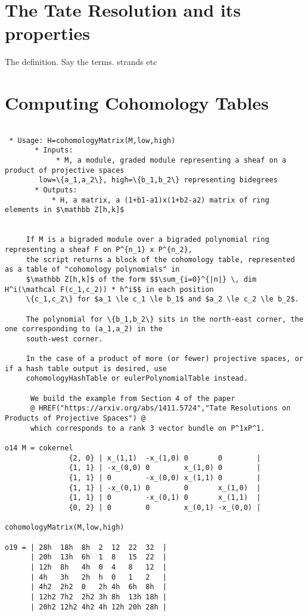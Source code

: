 \documentclass[twoside,12pt, leqno]{amsart}
\begin{document}
\section{The Tate Resolution and its properties}\label{TateRes}

The definition.  Say the terms.
strands etc

\section{Computing Cohomology Tables}

\begin{verbatim}
 
 * Usage: H=cohomologyMatrix(M,low,high)
       * Inputs:
            * M, a module, graded module representing a sheaf on a product of projective spaces
        low=\{a_1,a_2\}, high=\{b_1,b_2\} representing bidegrees
       * Outputs:
           * H, a matrix, a (1+b1-a1)x(1+b2-a2) matrix of ring elements in $\mathbb Z[h,k]$

 
     If M is a bigraded module over a bigraded polynomial ring representing a sheaf F on P^{n_1} x P^{n_2},
     the script returns a block of the cohomology table, represented as a table of "cohomology polynomials" in
     $\mathbb Z[h,k]$ of the form $$\sum_{i=0}^{|n|} \, dim H^i(\mathcal F(c_1,c_2)) * h^i$$ in each position
     \{c_1,c_2\} for $a_1 \le c_1 \le b_1$ and $a_2 \le c_2 \le b_2$. 
     
     The polynomial for \{b_1,b_2\} sits in the north-east corner, the one corresponding to (a_1,a_2) in the
     south-west corner.

     In the case of a product of more (or fewer) projective spaces, or if a hash table output is desired, use
     cohomologyHashTable or eulerPolynomialTable instead.

      We build the example from Section 4 of the paper
      @ HREF("https://arxiv.org/abs/1411.5724","Tate Resolutions on Products of Projective Spaces") @
      which corresponds to a rank 3 vector bundle on P^1xP^1. 

o14 M = cokernel 
               {2, 0} | x_(1,1)  -x_(1,0) 0       0        |
               {1, 1} | -x_(0,0) 0        x_(1,0) 0        |
               {1, 1} | 0        -x_(0,0) x_(1,1) 0        |
               {1, 1} | -x_(0,1) 0        0       x_(1,0)  |
               {1, 1} | 0        -x_(0,1) 0       x_(1,1)  |
               {0, 2} | 0        0        x_(0,1) -x_(0,0) |
   
cohomologyMatrix(M,low,high)

o19 = | 28h  18h  8h  2  12  22  32  |
      | 20h  13h  6h  1  8   15  22  |
      | 12h  8h   4h  0  4   8   12  |
      | 4h   3h   2h  h  0   1   2   |
      | 4h2  2h2  0   2h 4h  6h  8h  |
      | 12h2 7h2  2h2 3h 8h  13h 18h |
      | 20h2 12h2 4h2 4h 12h 20h 28h |   
      
    \end{verbatim}
\end{document}
